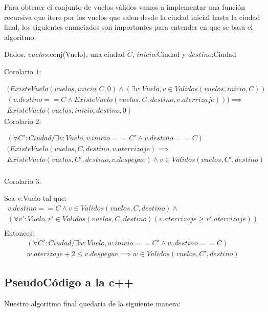 Para obtener el conjunto de vuelos v\'alidos vamos a implementar una funci\'on recursiva que itere por los vuelos que salen desde la ciudad inicial hasta la ciudad final, los siguientes enunciados son importantes para entender en que se basa el algoritmo.

Dados, $vuelos$:conj(Vuelo), una ciudad $C$, $inicio$:Ciudad y $destino$:Ciudad

Corolario 1:

\begin{align*}
(ExisteVuelo(vuelos,inicio, C, 0) \wedge (\exists v:Vuelo, v \in Validos(vuelos,inicio,C))\\
(v.destino == C \wedge ExisteVuelo(vuelos,C, destino, v.aterrizaje))) \implies \\ ExisteVuelo(vuelos,inicio, destino, 0)
\end{align*}
Corolario 2:

\begin{align*}
(\forall C':Ciudad / \exists v:Vuelo, v.inicio == C' \wedge v.destino == C)\\
(ExisteVuelo(vuelos,C,destino,v.aterrizaje) \implies \\
ExisteVuelo(vuelos,C',destino,v.despegue) \wedge v \in Validos(vuelos,C',destino)
\end{align*}
\begin{align*}
\end{align*}


Corolario 3:

Sea v:Vuelo tal que:
\begin{align*}
v.destino == C \wedge v \in Validos(vuelos,C,destino) \wedge\\
(\forall v':Vuelo, v' \in Validos(vuelos,C,destino)(v.aterrizaje \geq v'.aterrizaje))\\
\end{align*}
Entonces:
\begin{align*}
(\forall C':Ciudad / \exists w:Vuelo, w.inicio == C' \wedge w.destino == C)\\
w.aterizaje + 2 \leq v.despegue \implies w \in Validos(vuelos,C',destino) 
\end{align*}





\subsection{PseudoC\'odigo a la c++}

\newpage
Nuestro algoritmo final quedaria de la siguiente manera:

